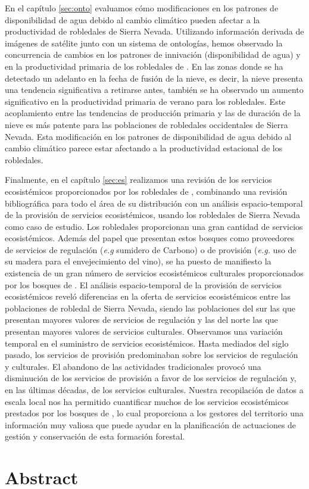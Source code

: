 En el \textcolor{ctcolormain}{capítulo \ref{sec:onto}} evaluamos cómo modificaciones en los patrones de disponibilidad de agua debido al cambio climático pueden afectar a la productividad de robledales de Sierra Nevada. Utilizando información derivada de imágenes de satélite junto con un sistema de ontologías, hemos observado la concurrencia de cambios en los patrones de innivación (disponibilidad de agua) y en la productividad primaria de los robledales de \Qp. En las zonas donde se ha detectado un adelanto en la fecha de fusión de la nieve, es decir, la nieve presenta una tendencia significativa a retirarse antes, también se ha observado un aumento significativo en la productividad primaria de verano para los robledales. Este acoplamiento entre las tendencias de producción primaria y las de duración de la nieve es más patente para las poblaciones de robledales occidentales de Sierra Nevada. Esta modificación en los patrones de disponibilidad de agua debido al cambio climático parece estar afectando a la productividad estacional de los robledales. 

Finalmente, en el \textcolor{ctcolormain}{capítulo \ref{sec:es}} realizamos una revisión de los servicios ecosistémicos proporcionados por los robledales de \Qp, combinando una revisión bibliográfica para todo el área de su distribución con un análisis espacio-temporal de la provisión de servicios ecosistémicos, usando los robledales de Sierra Nevada como caso de estudio. Los robledales proporcionan una gran cantidad de servicios ecosistémicos. Además del papel que presentan estos bosques como proveedores de servicios de regulación (\emph{e.g} sumidero de Carbono) o de provisión (\emph{e.g.} uso de su madera para el envejecimiento del vino), se ha puesto de manifiesto la existencia de un gran número de servicios ecosistémicos culturales proporcionados por los bosques de \Qp. El análisis espacio-temporal de la provisión de servicios ecosistémicos reveló diferencias en la oferta de servicios ecosistémicos entre las poblaciones de robledal de Sierra Nevada, siendo las poblaciones del sur las que presentan mayores valores de servicios de regulación y las del norte las que presentan mayores valores de servicios culturales. Observamos una variación temporal en el suministro de servicios ecosistémicos. Hasta mediados del siglo pasado, los servicios de provisión predominaban sobre los servicios de regulación y culturales. El abandono de las actividades tradicionales provocó una disminución de los servicios de provisión a favor de los servicios de regulación y, en las últimas décadas, de los servicios culturales. Nuestra recopilación de datos a escala local nos ha permitido cuantificar muchos de los servicios ecosistémicos prestados por los bosques de \Qp, lo cual proporciona a los gestores del territorio una información muy valiosa que puede ayudar en la planificación de actuaciones de gestión y conservación de esta formación forestal. 

\vspace*{20mm}

\section*{Abstract}\label{sec:abstract}
